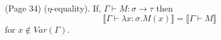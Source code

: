 (Page 34) ($\eta$-equality). If, $\Gamma \vdash M:\sigma \to \tau$ then
$$ \llbracket \Gamma \vdash \lambda x:\sigma . M(x) \rrbracket = \llbracket \Gamma \vdash M \rrbracket $$
for $x \notin Var(\Gamma)$.